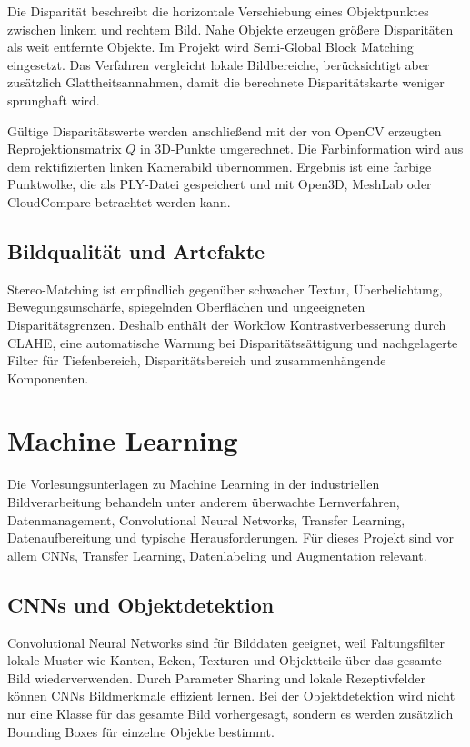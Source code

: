 Die Disparität beschreibt die horizontale Verschiebung eines Objektpunktes zwischen linkem
und rechtem Bild. Nahe Objekte erzeugen größere Disparitäten als weit entfernte Objekte. Im
Projekt wird Semi-Global Block Matching eingesetzt. Das Verfahren vergleicht lokale
Bildbereiche, berücksichtigt aber zusätzlich Glattheitsannahmen, damit die berechnete
Disparitätskarte weniger sprunghaft wird.

Gültige Disparitätswerte werden anschließend mit der von OpenCV erzeugten
Reprojektionsmatrix $Q$ in 3D-Punkte umgerechnet. Die Farbinformation wird aus dem
rektifizierten linken Kamerabild übernommen. Ergebnis ist eine farbige Punktwolke, die als
PLY-Datei gespeichert und mit Open3D, MeshLab oder CloudCompare betrachtet werden kann.

\subsection{Bildqualität und Artefakte}

Stereo-Matching ist empfindlich gegenüber schwacher Textur, Überbelichtung,
Bewegungsunschärfe, spiegelnden Oberflächen und ungeeigneten Disparitätsgrenzen. Deshalb
enthält der Workflow Kontrastverbesserung durch CLAHE, eine automatische Warnung bei
Disparitätssättigung und nachgelagerte Filter für Tiefenbereich, Disparitätsbereich und
zusammenhängende Komponenten.

\section{Machine Learning}

Die Vorlesungsunterlagen zu Machine Learning in der industriellen Bildverarbeitung behandeln
unter anderem überwachte Lernverfahren, Datenmanagement, Convolutional Neural Networks,
Transfer Learning, Datenaufbereitung und typische Herausforderungen. Für dieses Projekt sind
vor allem CNNs, Transfer Learning, Datenlabeling und Augmentation relevant.

\subsection{CNNs und Objektdetektion}

Convolutional Neural Networks sind für Bilddaten geeignet, weil Faltungsfilter lokale Muster
wie Kanten, Ecken, Texturen und Objektteile über das gesamte Bild wiederverwenden. Durch
Parameter Sharing und lokale Rezeptivfelder können CNNs Bildmerkmale effizient lernen. Bei
der Objektdetektion wird nicht nur eine Klasse für das gesamte Bild vorhergesagt, sondern es
werden zusätzlich Bounding Boxes für einzelne Objekte bestimmt.

